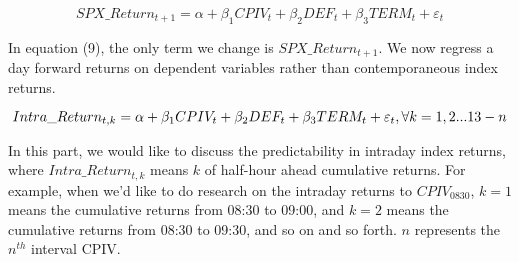 \begin{equation} \label{eq:1dayahead}
SPX\_Return_{t+1} = \alpha + \beta _{1}CPIV_{t} + \beta _{2}DEF_{t} + \beta _{3}TERM_{t} + \varepsilon _{t}
\end{equation}

In equation (9), the only term we change is $SPX\_Return_{t+1}$. We now regress a day forward returns on dependent variables rather than contemporaneous index returns. 

\begin{equation}
\small
Intra\_Return_{t, k} = \alpha + \beta _{1}CPIV_{t} + \beta _{2}DEF_{t} + \beta _{3}TERM_{t} + \varepsilon _{t},    
\forall k = 1, 2...13-n  
\end{equation}

In this part, we would like to discuss the predictability in intraday index returns, where $Intra\_Return_{t, k}$ means $k$ of half-hour ahead cumulative returns. For example, when we'd like to do research on the intraday returns to $CPIV_{0830}$, $k = 1$ means the cumulative returns from 08:30 to 09:00, and  $k = 2$ means the cumulative returns from 08:30 to 09:30, and so on and so forth. $n$ represents the $n^{th}$ interval CPIV.



